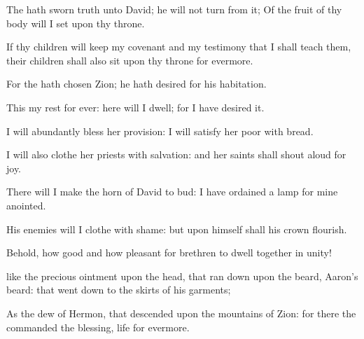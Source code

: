 {\Q {}The
{} hath
sworn
{}
truth unto
David; he will not
turn from it; Of the
fruit of thy
body will I
set upon thy
throne.


\par }{\Q {}If thy
children will
keep my
covenant and my
testimony
that I shall
teach them, their
children shall also
sit upon thy
throne for
evermore.


\par }{\Q {}For the
{} hath
chosen
Zion; he hath
desired
{} for his
habitation.


\par }{\Q {}This
{} my
rest for
ever: here will I
dwell; for I have
desired it.


\par }{\Q {}I will
abundantly
bless her
provision: I will
satisfy her
poor with
bread.


\par }{\Q {}I will also
clothe her
priests with
salvation: and her
saints shall shout
aloud for
joy.


\par }{\Q {}There will I
make the
horn of
David to
bud: I have
ordained a
lamp for mine
anointed.


\par }{\Q {}His
enemies will I
clothe with
shame: but upon himself shall his
crown
flourish.




\par }
{\Q {}Behold, how
good and how
pleasant
{} for
brethren to
dwell
together in
unity!


\par }{\Q {} like the
precious
ointment upon the
head, that ran
down upon the
beard,
{}
Aaron’s
beard: that went
down to the
skirts of his
garments;


\par }{\Q {}As the
dew of
Hermon,
{} that
descended upon the
mountains of
Zion: for there the
{}
commanded the
blessing,
{}
life for
evermore.




\par }
